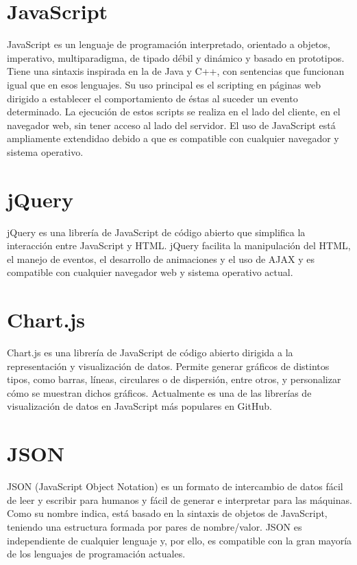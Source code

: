 \documentclass[a4paper, 12pt]{book}
\begin{document}
\section{JavaScript} 
\label{sec:javascript}

JavaScript\cite{javascript} es un lenguaje de programación interpretado, orientado a objetos, imperativo, multiparadigma, de tipado débil y dinámico y basado en prototipos. Tiene una sintaxis inspirada en la de Java y C++, con sentencias que funcionan igual que en esos lenguajes.
Su uso principal es el scripting en páginas web dirigido a establecer el comportamiento de éstas al suceder un evento determinado. La ejecución de estos scripts se realiza en el lado del cliente, en el navegador web, sin tener acceso al lado del servidor.
El uso de JavaScript está ampliamente extendidao debido a que es compatible con cualquier navegador y sistema operativo.

\section{jQuery} 
\label{sec:jquery}

jQuery\cite{jquery} es una librería de JavaScript de código abierto que simplifica la interacción entre JavaScript y HTML. jQuery facilita la manipulación del HTML, el manejo de eventos, el desarrollo de animaciones y el uso de AJAX y es compatible con cualquier navegador web y sistema operativo actual.

\section{Chart.js} 
\label{sec:chartjs}

Chart.js\cite{chartjs} es una librería de JavaScript de código abierto dirigida a la representación y visualización de datos. Permite generar gráficos de distintos tipos, como barras, líneas, circulares o de dispersión, entre otros, y personalizar cómo se muestran dichos gráficos.
Actualmente es una de las librerías de visualización de datos en JavaScript más populares en GitHub.

\section{JSON} 
\label{sec:json}

JSON\cite{json} (JavaScript Object Notation) es un formato de intercambio de datos fácil de leer y escribir para humanos y fácil de generar e interpretar para las máquinas. Como su nombre indica, está basado en la sintaxis de objetos de JavaScript, teniendo una estructura formada por pares de nombre/valor.
JSON es independiente de cualquier lenguaje y, por ello, es compatible con la gran mayoría de los lenguajes de programación actuales.
\end{document}
